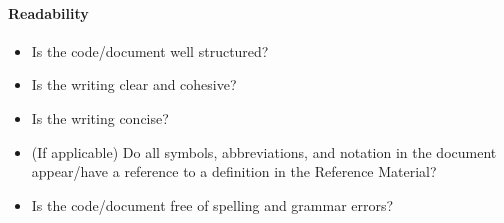 \paragraph{Readability}
\begin{itemize}

    \item Is the code/document well structured?

    \item Is the writing clear and cohesive?

    \item Is the writing concise?

    \item (If applicable) Do all symbols, abbreviations, and notation in the
    document appear/have a reference to a definition in the Reference Material?

    \item Is the code/document free of spelling and grammar errors?

\end{itemize}